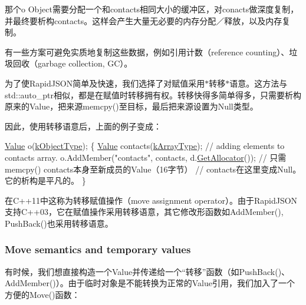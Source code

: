 那个{\ttfamily o} Object需要分配一个和contacts相同大小的缓冲区，对conacts做深度复制，并最终要析构contacts。这样会产生大量无必要的内存分配／释放，以及内存复制。

有一些方案可避免实质地复制这些数据，例如引用计数（reference counting）、垃圾回收（garbage collection, G\+C）。

为了使\+Rapid\+J\+S\+O\+N简单及快速，我们选择了对赋值采用$\ast$转移$\ast$语意。这方法与{\ttfamily std\+::auto\+\_\+ptr}相似，都是在赋值时转移拥有权。转移快得多简单得多，只需要析构原来的\+Value，把来源{\ttfamily memcpy()}至目标，最后把来源设置为\+Null类型。

因此，使用转移语意后，上面的例子变成：


\begin{DoxyCode}
\hyperlink{class_generic_value}{Value} o(\hyperlink{rapidjson_8h_a1d1cfd8ffb84e947f82999c682b666a7a146f46700e905e8df96a6a90b5c7640f}{kObjectType});
\{
    \hyperlink{class_generic_value}{Value} contacts(\hyperlink{rapidjson_8h_a1d1cfd8ffb84e947f82999c682b666a7af41527d6925efa3c5c3dadb23dfef7c8}{kArrayType});
    \textcolor{comment}{// adding elements to contacts array.}
    o.AddMember(\textcolor{stringliteral}{"contacts"}, contacts, d.\hyperlink{class_generic_document_aa4609d6b19f86aec1a6b96edf2c27686}{GetAllocator}());  \textcolor{comment}{// 只需 memcpy()
       contacts本身至新成员的Value（16字节）}
    \textcolor{comment}{// contacts在这里变成Null。它的析构是平凡的。}
\}
\end{DoxyCode}




在\+C++11中这称为转移赋值操作（move assignment operator）。由于\+Rapid\+J\+S\+ON 支持\+C++03，它在赋值操作采用转移语意，其它修改形函数如{\ttfamily Add\+Member()}, {\ttfamily Push\+Back()}也采用转移语意。\hypertarget{md_Commun_Externe_RapidJSON_doc_tutorial.zh-cn_TemporaryValues}{}\subsubsection{Move semantics and temporary values}\label{md_Commun_Externe_RapidJSON_doc_tutorial.zh-cn_TemporaryValues}
有时候，我们想直接构造一个\+Value并传递给一个“转移”函数（如{\ttfamily Push\+Back()}、{\ttfamily Add\+Member()}）。由于临时对象是不能转换为正常的\+Value引用，我们加入了一个方便的{\ttfamily Move()}函数：



